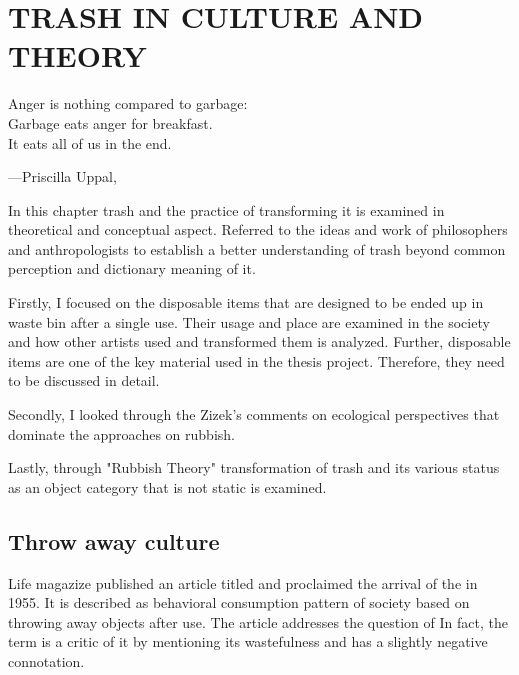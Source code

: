 \chapter{TRASH IN CULTURE AND THEORY}




\begin{singlespace}
\epigraph{Anger is nothing compared to garbage:\\Garbage eats anger for breakfast.\\It eats all of us in the end.}{\hfill---Priscilla Uppal, }
\end{singlespace}




%
%
In this chapter trash and the practice of transforming it is examined in theoretical and conceptual aspect. Referred to the ideas and work of philosophers and anthropologists to establish a better understanding of trash beyond common perception and dictionary meaning of it. 

Firstly, I focused on the disposable items that are designed to be ended up in waste bin after a single use. Their usage and place are examined in the society and how other artists used and transformed them is analyzed. Further, disposable items are one of the key material used in the thesis project. Therefore, they need to be discussed in detail.

Secondly, I looked through the Zizek's comments on ecological perspectives that dominate the approaches on rubbish.

Lastly, through "Rubbish Theory" transformation of trash and its various status as an object category that is not static is examined.  





%
%
\section{Throw away culture}





Life magazize published an article titled  and proclaimed the arrival of the  in 1955. It is described as behavioral consumption pattern of society based on throwing away objects after use. The article addresses the question of 
 \citep{tully2014throw} In fact, the term   is a critic of it by mentioning its wastefulness and has a slightly negative connotation. 


